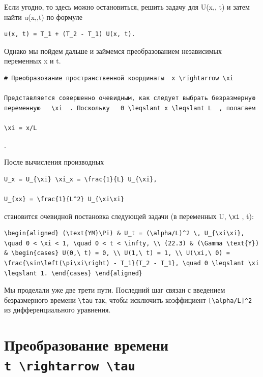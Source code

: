 \documentclass[
  ukrainian,
]{article}
\begin{document}
Если угодно, то здесь можно остановиться, решить задачу для U\left(x,,
t\right) и затем найти u\left(x,,t\right) по формуле

\begin{verbatim}
u(x, t) = T_1 + (T_2 - T_1) U(x, t).
\end{verbatim}

Однако мы пойдем дальше и займемся преобразованием независимых
переменных x и t.

\begin{verbatim}
# Преобразование пространственной координаты  x \rightarrow \xi

Представляется совершенно очевидным, как следует выбрать безразмерную переменную   \xi  . Поскольку   0 \leqslant x \leqslant L  , полагаем

\xi = x/L
\end{verbatim}

.

После вычисления производных

\begin{verbatim}
U_x = U_{\xi} \xi_x = \frac{1}{L} U_{\xi},

U_{xx} = \frac{1}{L^2} U_{\xi\xi}
\end{verbatim}

становится очевидной постановка следующей задачи (в переменных U,
\texttt{\textbackslash{}xi} , t):

\begin{verbatim}
\begin{aligned} (\text{YM}\Pi) & U_t = (\alpha/L)^2 \, U_{\xi\xi}, \quad 0 < \xi < 1, \quad 0 < t < \infty, \\ (22.3) & (\Gamma \text{Y}) & \begin{cases} U(0,\ t) = 0, \\ U(1,\ t) = 1, \\ U(\xi,\ 0) = \frac{\sin\left(\pi\xi\right) - T_1}{T_2 - T_1}, \quad 0 \leqslant \xi \leqslant 1. \end{cases} \end{aligned}
\end{verbatim}

Мы проделали уже две трети пути. Последний шаг связан с введением
безразмерного времени \texttt{\textbackslash{}tau} так, чтобы исключить
коэффициент \texttt{{[}\textbackslash{}alpha/L{]}\^{}2} из
дифференциального уравнения.

\section{\texorpdfstring{Преобразование времени
\texttt{t\ \textbackslash{}rightarrow\ \textbackslash{}tau}}{Преобразование времени t \textbackslash rightarrow \textbackslash tau}}\label{ux43fux440ux435ux43eux431ux440ux430ux437ux43eux432ux430ux43dux438ux435-ux432ux440ux435ux43cux435ux43dux438-t-rightarrow-tau}
\end{document}
